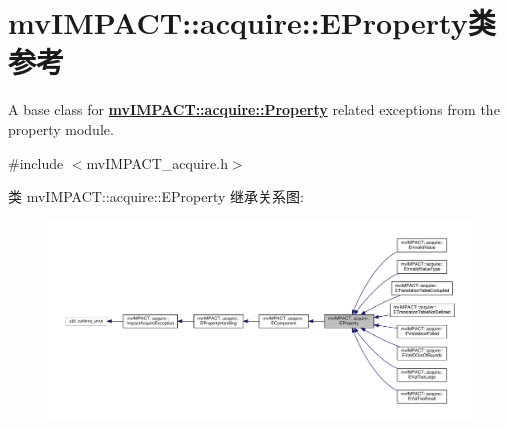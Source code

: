 \hypertarget{classmv_i_m_p_a_c_t_1_1acquire_1_1_e_property}{\section{mv\+I\+M\+P\+A\+C\+T\+:\+:acquire\+:\+:E\+Property类 参考}
\label{classmv_i_m_p_a_c_t_1_1acquire_1_1_e_property}
}


A base class for {\bfseries \hyperlink{classmv_i_m_p_a_c_t_1_1acquire_1_1_property}{mv\+I\+M\+P\+A\+C\+T\+::acquire\+::\+Property}} related exceptions from the property module.  




{\ttfamily \#include $<$mv\+I\+M\+P\+A\+C\+T\+\_\+acquire.\+h$>$}



类 mv\+I\+M\+P\+A\+C\+T\+:\+:acquire\+:\+:E\+Property 继承关系图\+:
\nopagebreak
\begin{figure}[H]
\begin{center}
\leavevmode
\includegraphics[width=350pt]{classmv_i_m_p_a_c_t_1_1acquire_1_1_e_property__inherit__graph}
\end{center}
\end{figure}


